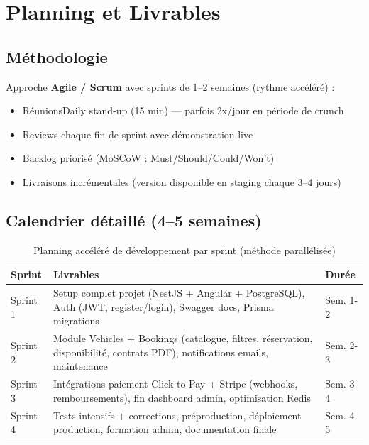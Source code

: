 \documentclass[12pt, a4paper]{article}
\begin{document}
\section{Planning et Livrables}

\subsection{Méthodologie}

Approche \textbf{Agile / Scrum} avec sprints de 1--2 semaines (rythme accéléré) :
\begin{itemize}[leftmargin=*,noitemsep]
  \item RéunionsDaily stand-up (15 min) — parfois 2x/jour en période de crunch
  \item Reviews chaque fin de sprint avec démonstration live
  \item Backlog priorisé (MoSCoW : Must/Should/Could/Won't)
  \item Livraisons incrémentales (version disponible en staging chaque 3--4 jours)
\end{itemize}

\subsection{Calendrier détaillé (4--5 semaines)}

\begin{table}[h]
  \centering
  \begin{tabular}{p{3cm} p{10cm} l}
    \toprule
    \textbf{Sprint} & \textbf{Livrables} & \textbf{Durée} \\
    \midrule
    Sprint 1 & Setup complet projet (NestJS + Angular + PostgreSQL), Auth (JWT, register/login), Swagger docs, Prisma migrations & Sem. 1-2 \\
    Sprint 2 & Module Vehicles + Bookings (catalogue, filtres, réservation, disponibilité, contrats PDF), notifications emails, maintenance & Sem. 2-3 \\
    Sprint 3 & Intégrations paiement Click to Pay + Stripe (webhooks, remboursements), fin dashboard admin, optimisation Redis & Sem. 3-4 \\
    Sprint 4 & Tests intensifs + corrections, préproduction, déploiement production, formation admin, documentation finale & Sem. 4-5 \\
    \bottomrule
  \end{tabular}
  \caption{Planning accéléré de développement par sprint (méthode parallélisée)}
\end{table}
\end{document}

